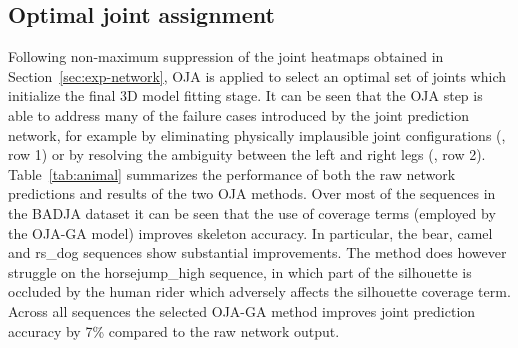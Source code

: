 

\subsection{Optimal joint assignment}
Following non-maximum suppression of the joint heatmaps obtained in Section~\ref{sec:exp-network}, OJA is applied to select an optimal set of joints which initialize the final 3D model fitting stage. It can be seen that the OJA step is able to address many of the failure cases introduced by the joint prediction network, for example by eliminating physically implausible joint configurations (, row 1) or by resolving the ambiguity between the left and right legs (, row 2).  Table~\ref{tab:animal} summarizes the performance of both the raw network predictions and results of the two OJA methods. Over most of the sequences in the BADJA dataset it can be seen that the use of coverage terms (employed by the OJA-GA model) improves skeleton accuracy. In particular, the bear, camel and rs\_dog sequences show substantial improvements. The method does however struggle on the horsejump\_high sequence, in which part of the silhouette is occluded by the human rider which adversely affects the silhouette coverage term. Across all sequences the selected OJA-GA method improves joint prediction accuracy by 7\% compared to the raw network output. 

